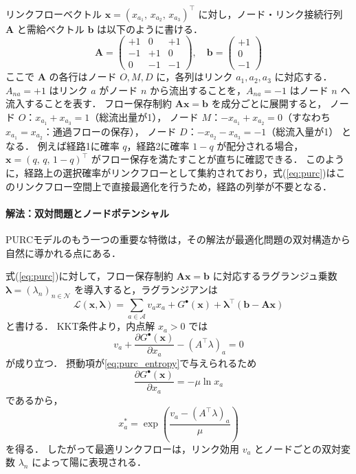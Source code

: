リンクフローベクトル $\bm{x} = (x_{a_1},\, x_{a_2},\, x_{a_3})^\top$ に対し，ノード・リンク接続行列 $\bm{A}$ と需給ベクトル $\bm{b}$ は以下のように書ける．
\begin{equation}\label{eq:purc_example}
  \bm{A} =
  \begin{pmatrix}
    +1 &  0 & +1 \\
    -1 & +1 &  0 \\
     0 & -1 & -1
  \end{pmatrix}, \quad
  \bm{b} =
  \begin{pmatrix}
    +1 \\ 0 \\ -1
  \end{pmatrix}
\end{equation}
ここで $\bm{A}$ の各行はノード $O, M, D$ に，各列はリンク $a_1, a_2, a_3$ に対応する．
$A_{na} = +1$ はリンク $a$ がノード $n$ から流出することを，$A_{na} = -1$ はノード $n$ へ流入することを表す．
フロー保存制約 $\bm{A}\bm{x} = \bm{b}$ を成分ごとに展開すると，
ノード $O$：$x_{a_1} + x_{a_3} = 1$（総流出量が1），
ノード $M$：$-x_{a_1} + x_{a_2} = 0$（すなわち $x_{a_1} = x_{a_2}$：通過フローの保存），
ノード $D$：$-x_{a_2} - x_{a_3} = -1$（総流入量が1）
となる．
例えば経路1に確率 $q$，経路2に確率 $1-q$ が配分される場合，$\bm{x} = (q,\, q,\, 1-q)^\top$ がフロー保存を満たすことが直ちに確認できる．
このように，経路上の選択確率がリンクフローとして集約されており，式(\ref{eq:purc})はこのリンクフロー空間上で直接最適化を行うため，経路の列挙が不要となる．


\paragraph{解法：双対問題とノードポテンシャル}
PURCモデルのもう一つの重要な特徴は，その解法が最適化問題の双対構造から自然に導かれる点にある．

式(\ref{eq:purc})に対して，フロー保存制約 $\bm A\bm x=\bm b$ に対応するラグランジュ乗数
$\bm\lambda=(\lambda_n)_{n\in\mathcal N}$ を導入すると，ラグランジアンは
\begin{equation}\label{eq:purc_lagrangian}
  \mathcal{L}(\bm{x}, \bm{\lambda}) = \sum_{a \in \mathcal{A}} v_a x_a + G^\bullet(\bm{x}) + \bm{\lambda}^\top (\bm{b} - \bm{A}\bm{x})
\end{equation}
と書ける．
KKT条件より，内点解 $x_a>0$ では
\begin{equation}
  v_a + \frac{\partial G^\bullet(\bm{x})}{\partial x_a} - (A^\top \lambda)_a = 0
\end{equation}
が成り立つ．
摂動項が\eqref{eq:purc_entropy}で与えられるため
\[
\frac{\partial G^\bullet(\bm{x})}{\partial x_a}=-\mu\ln x_a
\]
であるから，
\begin{equation}\label{eq:purc_optimal_flow}
  x_a^* = \exp\!\left(\frac{v_a-(A^\top\lambda)_a}{\mu}\right)
\end{equation}
を得る．
したがって最適リンクフローは，リンク効用 $v_a$ とノードごとの双対変数 $\lambda_n$ によって陽に表現される．

